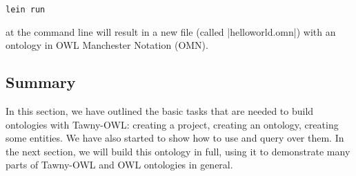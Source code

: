 \begin{verbatim}
lein run
\end{verbatim}

at the command line will result in a new file (called
|helloworld.omn|) with an ontology in OWL Manchester Notation (OMN).

\subsection{Summary}
\label{sec:summary}

In this section, we have outlined the basic tasks that are needed to
build ontologies with Tawny-OWL: creating a project, creating an
ontology, creating some entities. We have also started to show how to
use and query over them. In the next section, we will build this
ontology in full, using it to demonstrate many parts of Tawny-OWL and
OWL ontologies in general.

